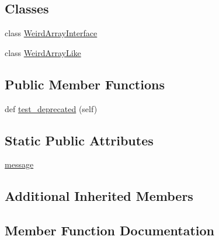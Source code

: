 \subsection*{Classes}
\begin{DoxyCompactItemize}
\item 
class \hyperlink{classnumpy_1_1core_1_1tests_1_1test__deprecations_1_1TestSpecialAttributeLookupFailure_1_1WeirdArrayInterface}{Weird\+Array\+Interface}
\item 
class \hyperlink{classnumpy_1_1core_1_1tests_1_1test__deprecations_1_1TestSpecialAttributeLookupFailure_1_1WeirdArrayLike}{Weird\+Array\+Like}
\end{DoxyCompactItemize}
\subsection*{Public Member Functions}
\begin{DoxyCompactItemize}
\item 
def \hyperlink{classnumpy_1_1core_1_1tests_1_1test__deprecations_1_1TestSpecialAttributeLookupFailure_af8fe5a31ed259f4c41cfade3e50c95c0}{test\+\_\+deprecated} (self)
\end{DoxyCompactItemize}
\subsection*{Static Public Attributes}
\begin{DoxyCompactItemize}
\item 
\hyperlink{classnumpy_1_1core_1_1tests_1_1test__deprecations_1_1TestSpecialAttributeLookupFailure_ac36f42ee0d21f2072e578b47e9cfbe76}{message}
\end{DoxyCompactItemize}
\subsection*{Additional Inherited Members}


\subsection{Member Function Documentation}
\mbox{\label{classnumpy_1_1core_1_1tests_1_1test__deprecations_1_1TestSpecialAttributeLookupFailure_af8fe5a31ed259f4c41cfade3e50c95c0}} 
